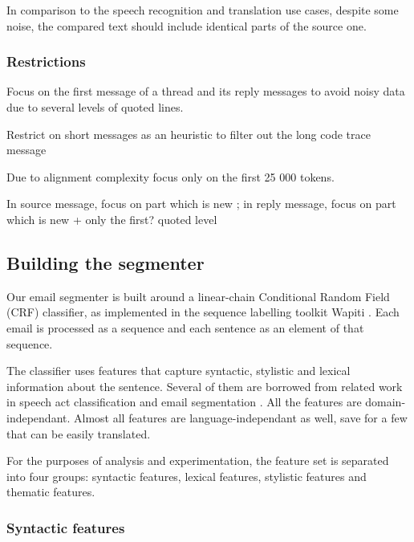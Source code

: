 
In comparison to the speech recognition and translation use cases, despite some noise, the compared text should include identical parts of the source one.



\subsubsection{Restrictions}
\label{}

Focus on the first message of a thread and its reply messages to avoid noisy data due to several levels of quoted lines.

Restrict on short messages as an heuristic to filter out the long code trace message

Due to alignment complexity focus only on the first 25 000 tokens.

In source message, focus on part which is new ; in reply message, focus on part which is new + only the first? quoted level 
 


\subsection{Building the segmenter}

Our email segmenter is built around a linear-chain Conditional Random Field (CRF) classifier, as implemented in the sequence labelling toolkit Wapiti \cite{lavergne2010practical}. Each email is processed as a sequence and each sentence as an element of that sequence.

The classifier uses features that capture syntactic, stylistic and lexical information about the sentence. Several of them are borrowed from related work in speech act classification \cite{qadir2011classifying} and email segmentation \cite{lampert2009segmenting}. All the features are domain-independant. Almost all features are language-independant as well, save for a few that can be easily translated.

For the purposes of analysis and experimentation, the feature set is separated into four groups: syntactic features, lexical features, stylistic features and thematic features.

\subsubsection{Syntactic features}

